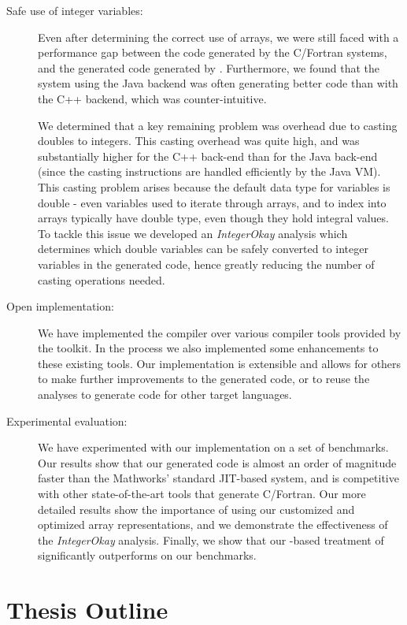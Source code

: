 \begin{description}
\item[Safe use of integer variables:]  Even after determining the
correct use of \xten arrays,  we were still faced with a performance gap
between the code generated by the C/Fortran systems,
and the generated \xten code generated by \mixten.
Furthermore,  we found that the \mixten system using the
\xten Java backend was often generating
better code than with the \xten C++ backend,  which was counter-intuitive.

We determined that a key remaining problem was overhead due to casting
doubles to integers.  This casting overhead was quite high, and was
substantially higher for the C++ back-end than for the Java back-end
(since the casting instructions are handled efficiently by the Java VM).
This casting problem arises because the default data type for \matlab
variables is double - even variables used to iterate through arrays, and
to  index into arrays typically have double type, even though they hold
integral values.  To tackle this issue we developed an
\emph{IntegerOkay} analysis which determines which double variables can
be safely converted to integer variables in the generated \xten code,
hence greatly reducing the number of casting operations needed.
  
\item[Open implementation:] We have implemented the
\mixten compiler over various \matlab compiler tools provided by the \mclab
toolkit.  In the process we also implemented some enhancements to these existing
tools. Our implementation is extensible and allows for others to make further
improvements to the generated \xten code, or to reuse the analyses to generate
code for other target languages.  

\item[Experimental evaluation:]
We have experimented with our \mixten implementation on a set of
benchmarks.  Our results show that our generated code is almost an order
of magnitude faster than the Mathworks' standard JIT-based system,  and is
competitive with other state-of-the-art tools that generate C/Fortran.
Our more detailed results show the importance of using our
customized and optimized \xten array representations, and we
demonstrate the effectiveness of the \emph{IntegerOkay} analysis.
Finally, we show that our \xten-based treatment of \parfor
significantly outperforms \matlab on our benchmarks.

\end{description}

\section{Thesis Outline}

